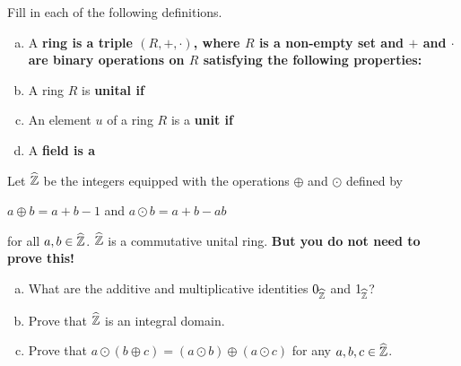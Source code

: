 \documentclass[11pt]{exam}
\begin{document}
\begin{questions}

\setlength\answerskip{0pt}

\addpoints

\question Fill in each of the following definitions.
\begin{enumerate}[(a)]
\item A \bf ring \md is a triple $(R, +, \cdot)$, where $R$ is a non-empty set and $+$ and $\cdot$ are binary operations on $R$ satisfying the following properties:
\vfill
\vfill
\vfill

\item A ring $R$ is \bf unital \md if
\vfill

\item An element $u$ of a ring $R$ is a \bf unit \md if
\vfill

\item A \bf field \md is a
\vfill
\newpage

\end{enumerate}

\question Let $\widehat{\mathbb{Z}}$ be the integers equipped with the operations $\oplus$ and $\odot$ defined by
\begin{center}
$a\oplus b = a + b - 1$ and $a\odot b = a + b - ab$
\end{center}
for all $a,b\in \widehat{\mathbb{Z}}$.  $\widehat{\mathbb{Z}}$ is a commutative unital ring.  \textbf{But you do not need to prove this!}
\begin{enumerate}[(a)]
\item What are the additive and multiplicative identities $0_{\widehat{\mathbb{Z}}}$ and $1_{\widehat{\mathbb{Z}}}$?
\item Prove that $\widehat{\mathbb{Z}}$ is an integral domain.
\item Prove that $a\odot(b\oplus c) = (a\odot  b) \oplus (a\odot c)$ for any $a,b,c\in \widehat{\mathbb{Z}}$.
\end{enumerate}
\vfill

\end{questions}
\end{document}
